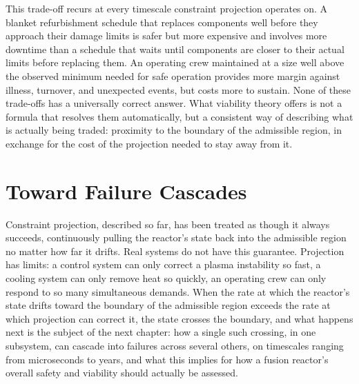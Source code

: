 This trade-off recurs at every timescale constraint projection operates on. A blanket refurbishment schedule that replaces components well before they approach their damage limits is safer but more expensive and involves more downtime than a schedule that waits until components are closer to their actual limits before replacing them. An operating crew maintained at a size well above the observed minimum needed for safe operation provides more margin against illness, turnover, and unexpected events, but costs more to sustain. None of these trade-offs has a universally correct answer. What viability theory offers is not a formula that resolves them automatically, but a consistent way of describing what is actually being traded: proximity to the boundary of the admissible region, in exchange for the cost of the projection needed to stay away from it.

\section{Toward Failure Cascades}

Constraint projection, described so far, has been treated as though it always succeeds, continuously pulling the reactor's state back into the admissible region no matter how far it drifts. Real systems do not have this guarantee. Projection has limits: a control system can only correct a plasma instability so fast, a cooling system can only remove heat so quickly, an operating crew can only respond to so many simultaneous demands. When the rate at which the reactor's state drifts toward the boundary of the admissible region exceeds the rate at which projection can correct it, the state crosses the boundary, and what happens next is the subject of the next chapter: how a single such crossing, in one subsystem, can cascade into failures across several others, on timescales ranging from microseconds to years, and what this implies for how a fusion reactor's overall safety and viability should actually be assessed.
